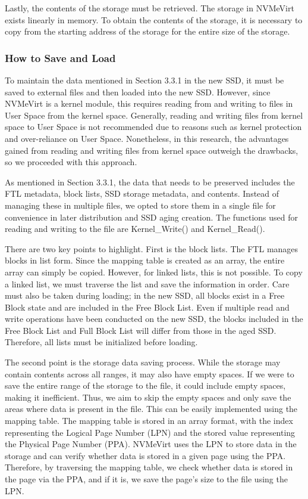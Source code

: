Lastly, the contents of the storage must be retrieved.
The storage in NVMeVirt exists linearly in memory. To obtain the contents of the storage, it is necessary to copy from the starting address of the storage for the entire size of the storage.

\subsubsection{ How to Save and Load}
To maintain the data mentioned in Section 3.3.1 in the new SSD, it must be saved to external files and then loaded into the new SSD. 
However, since NVMeVirt is a kernel module, this requires reading from and writing to files in User Space from the kernel space.
Generally, reading and writing files from kernel space to User Space is not recommended due to reasons such as kernel protection and over-reliance on User Space.
Nonetheless, in this research, the advantages gained from reading and writing files from kernel space outweigh the drawbacks, so we proceeded with this approach.


As mentioned in Section 3.3.1, the data that needs to be preserved includes the FTL metadata, block lists, SSD storage metadata, and contents. 
Instead of managing these in multiple files, we opted to store them in a single file for convenience in later distribution and SSD aging creation.
The functions used for reading and writing to the file are Kernel\_Write() and Kernel\_Read().


There are two key points to highlight. 
First is the block lists.
The FTL manages blocks in list form. Since the mapping table is created as an array, the entire array can simply be copied.
However, for linked lists, this is not possible.
To copy a linked list, we must traverse the list and save the information in order.
Care must also be taken during loading; in the new SSD, all blocks exist in a Free Block state and are included in the Free Block List. 
Even if multiple read and write operations have been conducted on the new SSD, the blocks included in the Free Block List and Full Block List will differ from those in the aged SSD. 
Therefore, all lists must be initialized before loading.


The second point is the storage data saving process. 
While the storage may contain contents across all ranges, it may also have empty spaces.
If we were to save the entire range of the storage to the file, it could include empty spaces, making it inefficient.
Thus, we aim to skip the empty spaces and only save the areas where data is present in the file. 
This can be easily implemented using the mapping table. 
The mapping table is stored in an array format, with the index representing the Logical Page Number (LPN) and the stored value representing the Physical Page Number (PPA).
NVMeVirt uses the LPN to store data in the storage and can verify whether data is stored in a given page using the PPA. 
Therefore, by traversing the mapping table, we check whether data is stored in the page via the PPA, and if it is, we save the page's size to the file using the LPN.



